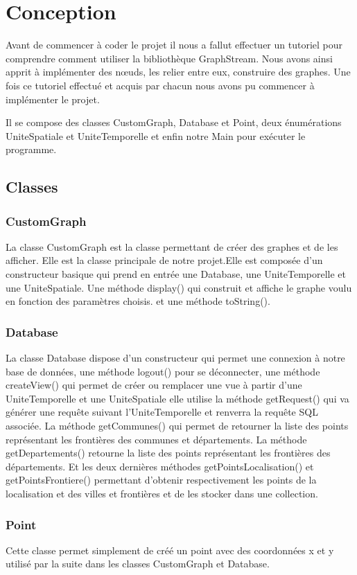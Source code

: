 \chapter{Conception}
Avant de commencer à coder le projet il nous a fallut effectuer un tutoriel pour comprendre comment utiliser la bibliothèque GraphStream. Nous avons ainsi apprit à implémenter des nœuds, les relier entre eux, construire des graphes.
Une fois ce tutoriel effectué et acquis par chacun nous avons pu commencer à implémenter le projet. \newline

Il se compose des classes CustomGraph, Database et Point, deux énumérations UniteSpatiale et UniteTemporelle et enfin notre Main pour exécuter le programme.
\section{Classes}
\subsection{CustomGraph}
 La classe CustomGraph est la classe permettant de créer des graphes et de les afficher. Elle est la classe principale de notre projet.Elle est composée d'un constructeur basique qui prend en entrée une Database, une UniteTemporelle et une UniteSpatiale.
 Une méthode display() qui construit et affiche le graphe voulu en fonction des paramètres choisis.
  et une méthode toString().
\subsection{Database}
 La classe Database dispose d'un constructeur qui permet une connexion à notre base de données, une méthode logout() pour se déconnecter, une méthode createView() qui permet de créer ou remplacer une vue à partir d'une UniteTemporelle et une UniteSpatiale elle utilise la méthode getRequest() qui va générer une requête suivant l'UniteTemporelle et renverra la requête SQL associée.
 La méthode getCommunes() qui permet de retourner la liste des points représentant les frontières des communes et départements. La méthode getDepartements() retourne la liste des points représentant les frontières des départements.
 Et les deux dernières méthodes getPointsLocalisation() et getPointsFrontiere() permettant d'obtenir respectivement les points de la localisation et des villes et frontières et de les stocker dans une collection.
\subsection{Point}
Cette classe permet simplement de créé un point avec des coordonnées x et y utilisé par la suite dans les classes CustomGraph et Database.

